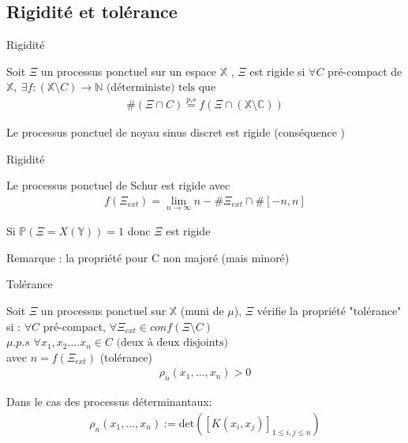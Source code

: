 \documentclass[french]{beamer}
\begin{document}
\subsection{Rigidité et tolérance}
\begin{frame} {Rigidité} 
\begin{definition}[\cite{gh}]
Soit $\Xi$ un processus ponctuel sur un espace $\mathbb{X}$ , 
$\Xi$ est rigide si 
$\forall C$ pré-compact de $\mathbb{X}, \  \exists f:(\mathbb{X}\setminus C)\to \mathbb{N}  \text{ (déterministe) tels que }$
\begin{align*}
 \#(\Xi\cap C) \overset{p.s}{=} f(\Xi \cap (\mathbb{X\setminus C}))
 \end{align*}
\end{definition}
\begin{theorem}
Le processus ponctuel de noyau sinus discret est rigide (conséquence \cite{Bufetov2016}) 
\end{theorem}

\end{frame}
\begin{frame}{Rigidité}

\begin{theorem}
Le processus ponctuel de Schur est rigide avec 
\begin{align*}
f(\Xi_{ext})=\lim_{n \to \infty} n- \#{\Xi_{ext}}\cap \#[-n,n]
\end{align*}
\end{theorem}
\begin{theorem}
Si $\mathbb{P}(\Xi=X(\mathbb{Y}))=1$ donc $\Xi$ est rigide 
\end{theorem}

Remarque :  la propriété pour C non majoré (mais minoré) 

\end{frame}
\begin{frame}{Tolérance}
\begin{definition}[\cite*{gp}] 

Soit $\Xi$ un processus ponctuel sur $\mathbb{X}$ (muni de $\mu$), $\Xi$ vérifie la propriété "tolérance" si :
$\forall C $ pré-compact, $\forall \Xi_{ext}\in conf(\Xi \setminus C)  $ \\  $\mu.p.s$  $ \forall x_1,x_2....x_n \in C \text{ (deux à deux disjoints)}$ \\ avec $n=f(\Xi_{ext})$ (tolérance)  
\begin{align*}
 \rho_n(x_1,\dots,x_n)>0
\end{align*}
\end{definition}

Dans le cas des processus déterminantaux:
\begin{align*}
\rho_n(x_1,\dots,x_n):=\mathrm{det}([K(x_i,x_j)]_{1\leq  i,j\leq n})
\end{align*}
\end{frame}
\end{document}
